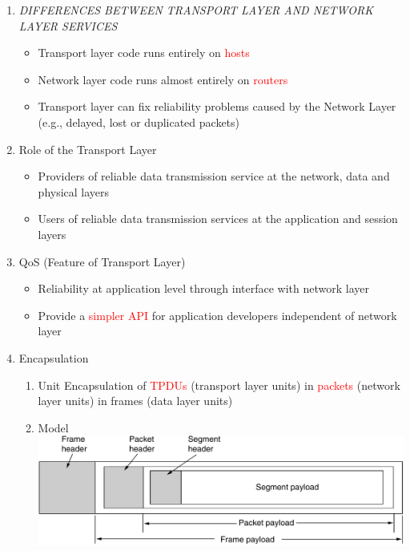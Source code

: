 \documentclass[a4paper,10pt]{article}
\newcommand{\red}[1]{\textcolor{red}{#1}}
\begin{document}
\begin{enumerate}
\begin{enumerate}
      \item\textit{DIFFERENCES BETWEEN TRANSPORT LAYER AND NETWORK LAYER SERVICES}
        \begin{itemize}
          \item Transport layer code runs entirely on \red{hosts}
          \item Network layer code runs almost entirely on \red{routers}
          \item Transport layer can fix reliability problems caused by the Network Layer (e.g., delayed, lost or duplicated packets)
        \end{itemize}
      \item Role of the Transport Layer
        \begin{itemize}
          \item Providers of reliable data transmission service
            \newline at the network, data and physical layers
          \item Users of reliable data transmission services
            \newline at the application and session layers
        \end{itemize}
      \item QoS (Feature of Transport Layer)
        \begin{itemize}
          \item Reliability at application level through interface with network layer
          \item Provide a \red{simpler API} for application developers independent of network layer
        \end{itemize}
      \item Encapsulation
        \begin{enumerate}
          \item Unit
            \newline Encapsulation of \red{TPDUs} (transport layer units) in \red{packets} (network layer units) in frames (data layer units)
          \item Model
            \newline\includegraphics[width=\textwidth]{tpdu}
        \end{enumerate}
    \end{enumerate}


\end{enumerate}
\end{document}
